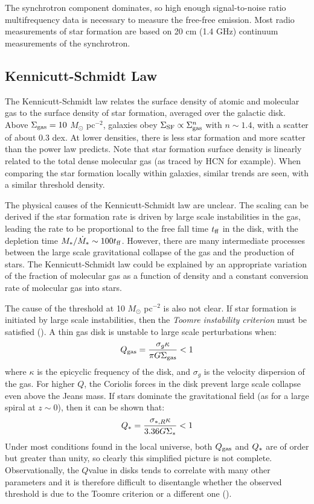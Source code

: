 The synchrotron component dominates, so high enough signal-to-noise
ratio multifrequency data is necessary to measure the free-free
emission. Most radio measurements of star formation are based on 20 cm
(1.4 GHz) continuum measurements of the synchrotron.

\subsection{Kennicutt-Schmidt Law}

The Kennicutt-Schmidt law relates the surface density of atomic and
molecular gas to the surface density of star formation, averaged over
the galactic disk. Above $\Sigma_{\rm gas} = 10$ $M_\odot$ pc$^{-2}$,
galaxies obey $\Sigma_{\rm SF} \propto \Sigma_{\rm gas}^n$ with $n\sim
1.4$, with a scatter of about 0.3 dex. At lower densities, there is
less star formation and more scatter than the power law predicts. Note
that star formation surface density is linearly related to the total
dense molecular gas (as traced by HCN for example). When comparing
the star formation locally within galaxies, similar trends are seen,
with a similar threshold density.

The physical causes of the Kennicutt-Schmidt law are unclear. The
scaling can be derived if the star formation rate is driven by large
scale instabilities in the gas, leading the rate to be proportional to
the free fall time $t_{\rm ff}$ in the disk, with the depletion time
$M_\ast/\dot M_\ast \sim 100 t_{\rm ff}$. However, there are many
intermediate processes between the large scale gravitational collapse
of the gas and the production of stars. The Kennicutt-Schmidt law
could be explained by an appropriate variation of the fraction of
molecular gas as a function of density and a constant conversion rate
of molecular gas into stars.

The cause of the threshold at 10 $M_\odot$ pc$^{-2}$ is also not
clear. If star formation is initiated by large scale instabilities,
then the {\it Toomre instability criterion} must be satisfied
(\citealt{toomre64a}). A thin gas disk is unstable to large scale
perturbations when:
\begin{equation}
Q_{\rm gas} = \frac{\sigma_g \kappa}{\pi G \Sigma_{\rm gas}} < 1
\end{equation}
where $\kappa$ is the epicyclic frequency of the disk, and $\sigma_g$
is the velocity dispersion of the gas. For higher $Q$, the Coriolis
forces in the disk prevent large scale collapse even above the Jeans
mass. If stars dominate the gravitational field (as for a large spiral
at $z\sim 0$), then it can be shown that:
\begin{equation}
Q_{\rm \ast} = \frac{\sigma_{\ast,R} \kappa}{3.36 G \Sigma_{\rm \ast}} < 1
\end{equation}
Under most conditions found in the local universe, both $Q_{\rm gas}$
and $Q_{\rm \ast}$ are of order but greater than unity, so clearly
this simplified picture is not complete. Observationally, the $Q$value in disks tends to correlate with many other parameters and it is
therefore difficult to disentangle whether the observed threshold is
due to the Toomre criterion or a different one (\citealt{leroy08a}).

